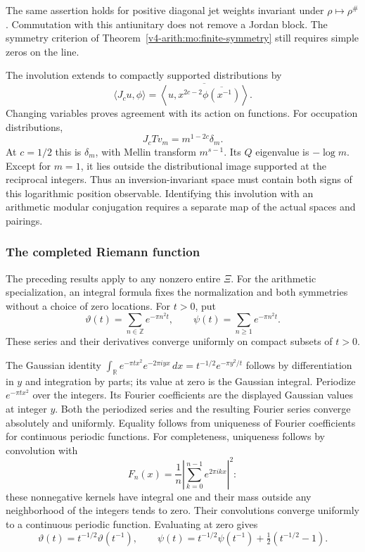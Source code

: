 The same assertion holds for positive diagonal jet weights invariant
under $\rho\mapsto\rho^\#$. Commutation with this antiunitary does
not remove a Jordan block. The symmetry criterion of
Theorem~\ref{v4-arith:mo:finite-symmetry} still requires simple zeros on the line.

The involution extends to compactly supported distributions by
\[
 \langle J_cu,\phi\rangle
 =\overline{\left\langle u,
         x^{2c-2}\overline{\phi(x^{-1})}\right\rangle}.
\]
Changing variables proves agreement with its action on functions.
For occupation distributions,
\[
 J_cTv_m=m^{1-2c}\delta_m.
\]
At $c=1/2$ this is $\delta_m$, with Mellin transform $m^{s-1}$.
Its $Q$ eigenvalue is $-\log m$. Except for $m=1$, it lies outside
the distributional image supported at the reciprocal integers.
Thus an inversion-invariant space must contain both signs of this
logarithmic position observable. Identifying this involution with
an arithmetic modular conjugation requires a separate map of the
actual spaces and pairings.

\subsubsection{The completed Riemann function}

The preceding results apply to any nonzero entire $\Xi$.
For the arithmetic specialization, an integral formula fixes the
normalization and both symmetries without a choice of zero locations.
For $t>0$, put
\[
 \vartheta(t)=\sum_{n\in\mathbb Z}e^{-\pi n^2t},\qquad
 \psi(t)=\sum_{n\geq1}e^{-\pi n^2t}.
\]
These series and their derivatives converge uniformly on compact
subsets of $t>0$.

The Gaussian identity
$\int_{\mathbb R}e^{-\pi t x^2}e^{-2\pi i yx}\,dx
=t^{-1/2}e^{-\pi y^2/t}$ follows by differentiation in $y$ and
integration by parts; its value at zero is the Gaussian integral.
Periodize $e^{-\pi t x^2}$ over the integers. Its Fourier coefficients
are the displayed Gaussian values at integer $y$. Both the
periodized series and the resulting Fourier series converge
absolutely and uniformly. Equality follows from uniqueness of
Fourier coefficients for continuous periodic functions. For
completeness, uniqueness follows by convolution with
\[
 F_n(x)=\frac1n\left|\sum_{k=0}^{n-1}e^{2\pi i kx}\right|^2:
\]
these nonnegative kernels have integral one and their mass outside
any neighborhood of the integers tends to zero. Their convolutions
converge uniformly to a continuous periodic function. Evaluating
at zero gives
\[
 \vartheta(t)=t^{-1/2}\vartheta(t^{-1}),\qquad
 \psi(t)=t^{-1/2}\psi(t^{-1})+\tfrac12(t^{-1/2}-1).
\]


